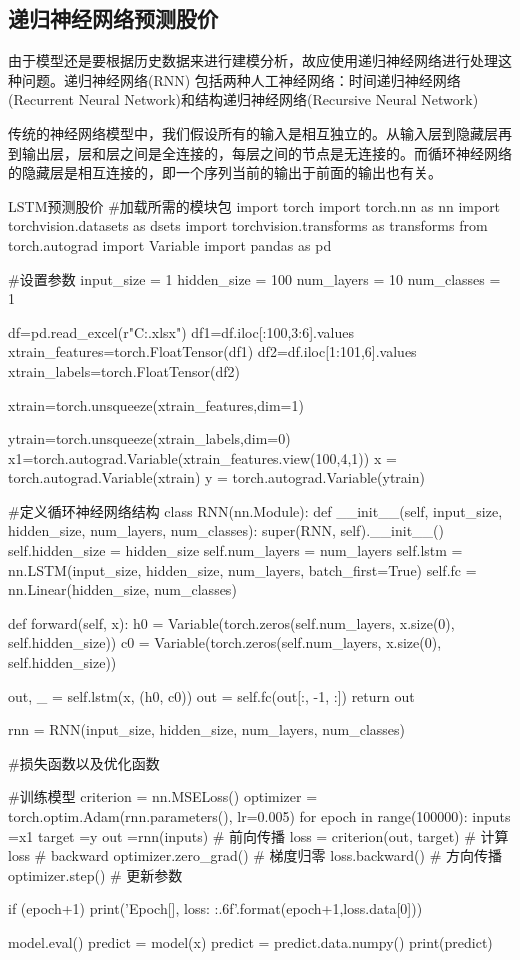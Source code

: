 \documentclass[openbib]{article}
\begin{document}
\subsection{递归神经网络预测股价}

由于模型还是要根据历史数据来进行建模分析，故应使用递归神经网络进行处理这种问题。递归神经网络(RNN)
包括两种人工神经网络：时间递归神经网络(Recurrent Neural Network)和结构递归神经网络(Recursive Neural Network)

传统的神经网络模型中，我们假设所有的输入是相互独立的。从输入层到隐藏层再到输出层，层和层之间是全连接的，每层之间的节点是无连接的。而循环神经网络的隐藏层是相互连接的，即一个序列当前的输出于前面的输出也有关。

\begin{Python}{LSTM预测股价}
#加载所需的模块包
import torch
import torch.nn as nn
import torchvision.datasets as dsets
import torchvision.transforms as transforms
from torch.autograd import Variable
import pandas as pd

#设置参数
input_size = 1
hidden_size = 100
num_layers = 10
num_classes = 1

df=pd.read_excel(r"C:\Users\yjb\Desktop\stock.xlsx")
df1=df.iloc[:100,3:6].values
xtrain_features=torch.FloatTensor(df1)
df2=df.iloc[1:101,6].values
xtrain_labels=torch.FloatTensor(df2)

xtrain=torch.unsqueeze(xtrain_features,dim=1)

ytrain=torch.unsqueeze(xtrain_labels,dim=0)
x1=torch.autograd.Variable(xtrain_features.view(100,4,1))
x = torch.autograd.Variable(xtrain)
y = torch.autograd.Variable(ytrain)

#定义循环神经网络结构
class RNN(nn.Module):
	def __init__(self, input_size, hidden_size, num_layers, num_classes):
		super(RNN, self).__init__()
		self.hidden_size = hidden_size
		self.num_layers = num_layers
		self.lstm = nn.LSTM(input_size, hidden_size, num_layers, batch_first=True)
		self.fc = nn.Linear(hidden_size, num_classes)

	def forward(self, x):
		h0 = Variable(torch.zeros(self.num_layers, x.size(0), self.hidden_size))
		c0 = Variable(torch.zeros(self.num_layers, x.size(0), self.hidden_size))

		out, _ = self.lstm(x, (h0, c0))
		out = self.fc(out[:, -1, :])
		return out

rnn = RNN(input_size, hidden_size, num_layers, num_classes)

#损失函数以及优化函数


#训练模型
criterion = nn.MSELoss()
optimizer = torch.optim.Adam(rnn.parameters(), lr=0.005)
for epoch in range(100000):
	inputs =x1
	target =y
	out =rnn(inputs) # 前向传播
	loss = criterion(out, target) # 计算loss
# backward
	optimizer.zero_grad() # 梯度归零
	loss.backward() # 方向传播
	optimizer.step() # 更新参数

	if (epoch+1) %
		print('Epoch[{}], loss: {:.6f}'.format(epoch+1,loss.data[0]))

model.eval()
predict = model(x)
predict = predict.data.numpy()
print(predict)
\end{Python}
\end{document}
